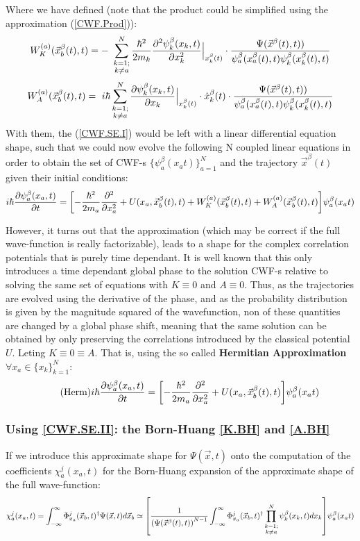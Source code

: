 \documentclass[11pt, a4paper]{article} %
\begin{document}
Where we have defined (note that the product could be simplified using the approximation (\ref{CWF.Prod})):
$$
W^{(a)}_K(\vec{x}_b^\beta (t),t)=- \ \sum_{\substack{k=1; \\ k\neq a}}^{N} \frac{\hbar^2}{2m_k}\pdv[2]{\psi_k^\beta(x_k,t)}{x_k}\Big\rvert_{x_k^\beta(t)}\cdot\frac{\Psi(\vec{x}^\beta(t),t))}{\psi^\beta_a(x_a^\beta(t),t) \psi^\beta_k(x_k^\beta(t),t)} 
$$
$$
W^{(a)}_A(\vec{x}_b^\beta (t),t)=\ i\hbar \sum_{\substack{k=1; \\ k\neq a}}^{N} \pdv{\psi_k^\beta(x_k,t)}{x_k}\Big\rvert_{x_k^\beta(t)}\cdot \dot{x}_k^\beta(t) \cdot\frac{\Psi(\vec{x}^\beta(t),t))}{\psi^\beta_a(x_a^\beta(t),t) \psi^\beta_k(x_k^\beta(t),t)}
$$
With them, the (\ref{CWF.SE.I}) would be left with a linear differential equation shape, such that we could now evolve the following N coupled linear equations in order to obtain the set of CWF-s $\{\psi_a^\beta(x_a t) \}_{a=1}^N$ and the trajectory $\vec{x}^\beta(t)$ given their initial conditions:
$$
i\hbar \pdv{\psi_a^\beta(x_a, t)}{t} = \qty[- \frac{\hbar^2}{2m_a}\pdv[2]{}{x_a} + U(x_a, \vec{x}_b^\beta(t), t)+ W^{(a)}_K(\vec{x}_b^\beta (t),t) +W^{(a)}_A(\vec{x}_b^\beta (t),t) ]\psi_a^\beta(x_a t)
$$

However, it turns out that the approximation (which may be correct if the full wave-function is really factorizable), leads to a shape for the complex correlation potentials that is purely time dependant. It is well known that this only introduces a time dependant global phase to the solution CWF-s relative to solving the same set of equations with $K\equiv 0$ and $A \equiv 0$. Thus, as the trajectories are evolved using the derivative of the phase, and as the probability distribution is given by the magnitude squared of the wavefunction, non of these quantities are changed by a global phase shift, meaning that the same solution can be obtained by only preserving the correlations introduced by the classical potential $U$. Leting $K\equiv 0 \equiv A$. That is, using the so called {\bf Hermitian Approximation} $\forall x_a \in \{ x_k\}_{k=1}^N$:
\begin{equation}\label{Herm}\tag{Herm}
i\hbar \pdv{\psi_a^\beta(x_a, t)}{t} = \qty[- \frac{\hbar^2}{2m_a}\pdv[2]{}{x_a} + U(x_a, \vec{x}_b^\beta(t), t)]\psi_a^\beta(x_a t)
\end{equation}

\subsubsection{Using \ref{CWF.SE.II}: the Born-Huang \ref{K.BH} and \ref{A.BH}}
If we introduce this approximate shape for $\Psi(\vec{x},t)$ onto the computation of the coefficients $\chi_a^j(x_a,t)$ for the Born-Huang expansion of the approximate shape of the full wave-function:
$$
\chi_a^j(x_a,t)= \int_{-\infty}^\infty \Phi_{x_a}^j(\vec{x}_b,t)^\dagger \Psi(\vec{x},t) d\vec{x}_b \simeq \qty[\frac{1}{ \qty(\Psi(\vec{x}^\beta(t),t))^{N-1}} \int_{-\infty}^\infty \Phi_{x_a}^j(\vec{x}_b,t)^\dagger \prod_{\substack{k=1; \\ k\neq a}}^{N} \psi^\beta_k(x_k,t) dx_k ] \psi_a^\beta(x_a t)
$$
\end{document}
